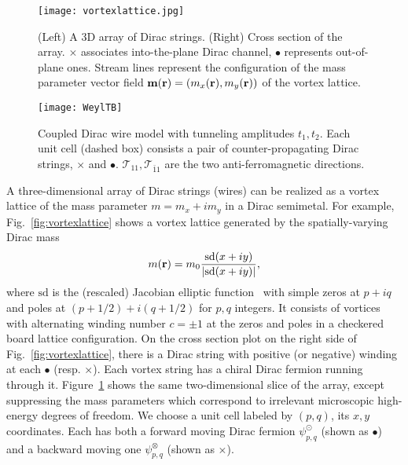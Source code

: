 \begin{figure}[htbp]
	\centering\texttt{[image: vortexlattice.jpg]}
	\caption[(Left) A 3D array of Dirac strings. (Right) Cross section of the array.]{(Left) A 3D array of Dirac strings. (Right) Cross section of the array. {\color{red}$\boldsymbol\times$} associates into-the-plane Dirac channel, {\color{green}$\bullet$} represents out-of-plane ones. Stream lines represent the configuration of the mass parameter vector field ${\bf m}({\bf r})=(m_x({\bf r}),m_y({\bf r}))$ of the vortex lattice.}\label{fig:vortexlattice}
	\centering\texttt{[image: WeylTB]}
	\caption[Coupled Dirac wire model with tunneling amplitudes.]{Coupled Dirac wire model with tunneling amplitudes $t_1,t_2$. Each unit cell (dashed box) consists a pair of counter-propagating Dirac strings, {\color{red}$\boldsymbol\times$} and {\color{green}$\bullet$}. $\mathcal{T}_{11},\mathcal{T}_{\bar{1}1}$ are the two anti-ferromagnetic directions.}\label{fig:WeylTB}
\end{figure}

A three-dimensional array of Dirac strings (wires) can be realized as a vortex lattice of the mass parameter $m=m_x+im_y$ in a Dirac semimetal. For example, Fig.~\ref{fig:vortexlattice} shows a vortex lattice generated by the spatially-varying Dirac mass \begin{align}m({\bf r})=m_0\frac{\mathrm{sd}(x+iy)}{|\mathrm{sd}(x+iy)|},\label{Jacobielliptic}\end{align} where $\mathrm{sd}$ is the (rescaled) Jacobian elliptic function~\cite{ReinhardtWalker10} with simple zeros at $p+iq$ and poles at $(p+1/2)+i(q+1/2)$ for $p,q$ integers. It consists of vortices with alternating winding number $c=\pm1$ at the zeros and poles in a checkered board lattice configuration. On the cross section plot on the right side of Fig.~\ref{fig:vortexlattice}, there is a Dirac string with positive (or negative) winding at each {\color{green}$\bullet$} (resp. {\color{red}$\boldsymbol\times$}). Each vortex string has a chiral Dirac fermion running through it. Figure~\ref{fig:WeylTB} shows the same two-dimensional slice of the array, except suppressing the mass parameters which correspond to irrelevant microscopic high-energy degrees of freedom. We choose a unit cell labeled by $(p,q)$, its $x,y$ coordinates. Each has both a forward moving Dirac fermion $\psi_{p,q}^\odot$ (shown as {\color{green}$\bullet$}) and a backward moving one $\psi_{p,q}^\otimes$ (shown as {\color{red}$\boldsymbol\times$}). 

